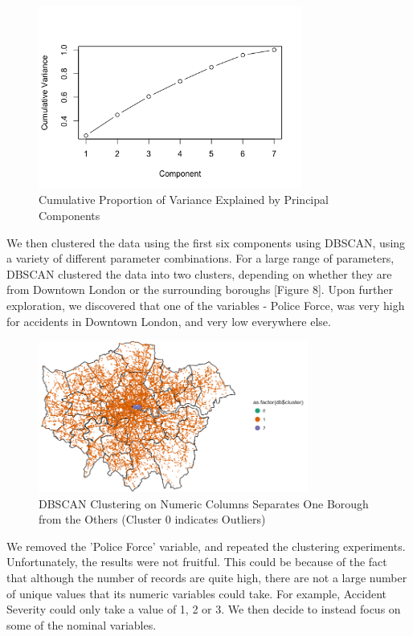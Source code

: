 \documentclass{neu_handout}
\begin{document}
\begin{figure}[!htb]
    \begin{center}
      \includegraphics[height=6cm,keepaspectratio]{pca.png}
      \caption{Cumulative Proportion of Variance Explained by Principal Components}
    \end{center}
 \end{figure}

We then clustered the data using the first six components using DBSCAN, using a variety of different parameter combinations. For a large range of parameters, DBSCAN clustered the data into two clusters, depending on whether they are from Downtown London or the surrounding boroughs [Figure 8]. Upon further exploration, we discovered that one of the variables - Police Force, was very high for accidents in Downtown London, and very low everywhere else. \\

\begin{figure}[!htb]
    \begin{center}
      \includegraphics[height=5cm, keepaspectratio]{db_1_county.png}
      \caption{DBSCAN Clustering on Numeric Columns Separates One Borough from the Others (Cluster 0 indicates Outliers)}
    \end{center}
\end{figure}

We removed the 'Police Force' variable, and repeated the clustering experiments. Unfortunately, the results were not fruitful. This could be because of the fact that although the number of records are quite high, there are not a large number of unique values that its numeric variables could take. For example, Accident Severity could only take a value of 1, 2 or 3. We then decide to instead focus on some of the nominal variables. \\
\end{document}

